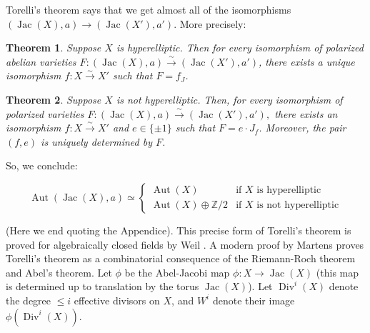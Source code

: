 \documentclass[12pt,reqno]{amsart}
\DeclareMathOperator{\Aut}{Aut}
\DeclareMathOperator{\Jac}{Jac}
\DeclareMathOperator{\Div}{Div}
\newcommand{\Z}{\mathbb{Z}}
\newtheorem*{thm*}{Theorem}
\theoremstyle{definition}
\theoremstyle{remark}
\newtheorem*{remark}{Remark}
\begin{document}
 


Torelli's theorem says that we get almost all of the isomorphisms $(\Jac(X), a) \to (\Jac(X'), a')$. More precisely:

\begin{thm*} Suppose $X$ is hyperelliptic.  Then for every isomorphism of polarized abelian varieties $F: (\operatorname{Jac}(X),a) \stackrel{\sim}{\rightarrow} (\operatorname{Jac}(X'),a')$, there exists a unique isomorphism $f: X \stackrel{\sim}{\rightarrow} X'$ such that $F = f_J$.  \end{thm*}

\begin{thm*} Suppose $X$ is not hyperelliptic.  Then, for every isomorphism of polarized varieties $F: (\operatorname{Jac}(X),a) \stackrel{\sim}{\rightarrow} (\operatorname{Jac}(X'),a'),$ there exists an isomorphism $f: X \stackrel{\sim}{\rightarrow} X'$ and $e \in \{ \pm 1\}$ such that $F = e \cdot  J_f$.  Moreover, the pair $(f,e)$ is uniquely determined by $F$. \end{thm*}

So, we conclude: 

$$\Aut(\Jac(X), a) \simeq \begin{cases} \Aut(X) & \text{if } X \text{ is hyperelliptic} \\
\Aut(X) \oplus \Z/2 &  \text{if } X \text{ is not hyperelliptic}
\end{cases} $$



(Here we end quoting the Appendice). This precise form of Torelli's theorem is proved for algebraically closed fields by Weil \cite{oe}. A modern proof by Martens \cite{finn} proves Torelli's theorem as a combinatorial consequence of the Riemann-Roch theorem and Abel's theorem. Let $\phi$ be the Abel-Jacobi map $\phi: X \to \Jac(X)$ (this map is determined up to translation by the torus $\Jac(X)$). Let $\Div^i(X)$ denote the degree $\leq i$ effective divisors on $X$, and $W^i$ denote their image $\phi(\Div^i(X))$. 
\end{document}

